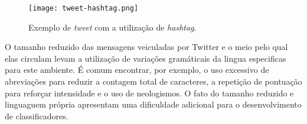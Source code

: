 \begin{figure}
\begin{center} {
    \begin{center}
    \texttt{[image: tweet-hashtag.png]}
    \caption{Exemplo de \textit{tweet} com a utilização de \textit{hashtag}.}
    \label{fig:hashtag}
    \end{center}
}
\end{center}
\end{figure}

O tamanho reduzido das mensagens veiculadas por Twitter e o meio pelo qual elas circulam levam a utilização de
variações gramáticais da lingua especificas para este ambiente.
É comum encontrar, por exemplo, o uso excessivo de abreviações para reduzir a contagem total de caracteres, a repetição
de pontuação para reforçar intensidade e o uso de neologismos.
O fato do tamanho reduzido e linguaguem própria apresentam uma dificuldade adicional para o desenvolvimento  de
classificadores.
